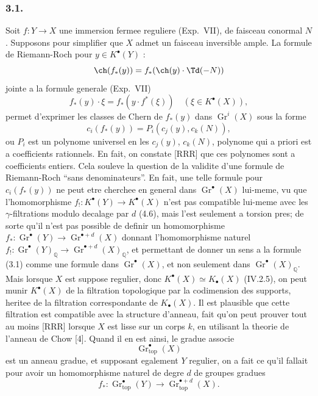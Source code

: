 \subsubsection*{3.1.}
Soit $f : Y \to X$ une immersion fermee reguliere (Exp.\ VII), de faisceau conormal $N$. Supposons pour simplifier que $X$ admet un faisceau inversible ample. La formule de Riemann-Roch pour $y \in K^{\bullet}(Y)$ :
\[
\ch(f_{*}(y)) = f_{*}(\ch(y) \cdot \Td(-N))
\]
jointe a la formule generale (Exp.\ VII)
\[
f_{*}(y) \cdot \xi = f_{*}(y \cdot f^{*}(\xi)) \quad (\xi \in K^{\bullet}(X)),
\]
permet d'exprimer les classes de Chern de $f_{*}(y)$ dans $\operatorname{Gr}^{i}(X)$ sous la forme
\[
c_i(f_{*}(y)) = P_i(c_j(y), c_k(N)), \tag{3.1}
\]
ou $P_i$ est un polynome universel en les $c_j(y)$, $c_k(N)$, polynome qui a priori est a coefficients rationnels. En fait, on constate [RRR] que ces polynomes sont a coefficients entiers. Cela souleve la question de la validite d'une formule de Riemann-Roch ``sans denominateurs''. En fait, une telle formule pour $c_i(f_{*}(y))$ ne peut etre cherchee en general dans $\operatorname{Gr}^{\bullet}(X)$ lui-meme, vu que l'homomorphisme $f_{!} : K^{\bullet}(Y) \to K^{\bullet}(X)$ n'est pas compatible lui-meme avec les $\gamma$-filtrations modulo decalage par $d$ (4.6), mais l'est seulement a torsion pres; de sorte qu'il n'est pas possible de definir un homomorphisme $f_{*} : \operatorname{Gr}^{\bullet}(Y) \to \operatorname{Gr}^{\bullet+d}(X)$ donnant l'homomorphisme naturel $f_{!} : \operatorname{Gr}^{\bullet}(Y)_{\mathbb{Q}} \to \operatorname{Gr}^{\bullet+d}(X)_{\mathbb{Q}}$, et permettant de donner un sens a la formule (3.1) comme une formule dans $\operatorname{Gr}^{\bullet}(X)$, et non seulement dans $\operatorname{Gr}^{\bullet}(X)_{\mathbb{Q}}$. Mais lorsque $X$ est suppose regulier, donc $K^{\bullet}(X) \simeq K_{\bullet}(X)$ (IV.2.5), on peut munir $K^{\bullet}(X)$ de la filtration topologique par la codimension des supports, heritee de la filtration correspondante de $K_{\bullet}(X)$. Il est plausible que cette filtration est compatible avec la structure d'anneau, fait qu'on peut prouver tout au moins [RRR] lorsque $X$ est lisse sur un corps $k$, en utilisant la theorie de l'anneau de Chow [4]. Quand il en est ainsi, le gradue associe
\[
\operatorname{Gr}_{\mathrm{top}}^{\bullet}(X)
\]
est un anneau gradue, et supposant egalement $Y$ regulier, on a fait ce qu'il fallait pour avoir un homomorphisme naturel de degre $d$ de groupes gradues
\[
f_{*} : \operatorname{Gr}_{\mathrm{top}}^{\bullet}(Y) \longrightarrow \operatorname{Gr}_{\mathrm{top}}^{\bullet+d}(X).
\]
